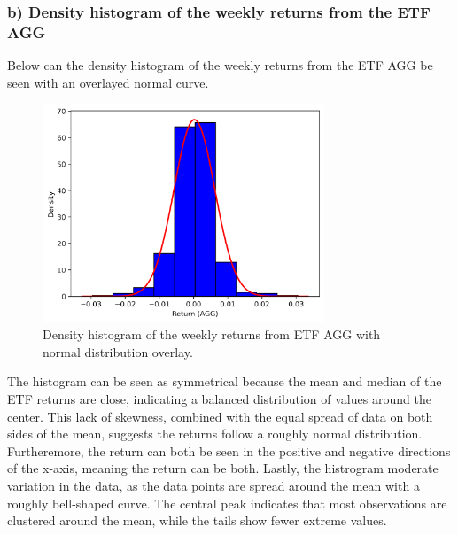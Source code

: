 \documentclass{rapport}
\begin{document}
\subsubsection*{\textbf{b)} Density histogram of the weekly returns from the ETF AGG}
\noindent
Below can the density histogram of the weekly returns from the ETF AGG be seen with an overlayed normal curve. 
\begin{figure}[H]
    \centering
    \includegraphics[width=0.75\textwidth]{histogram_with_normal_curve.png}  %
    \caption{\small Density histogram of the weekly returns from ETF AGG with normal distribution overlay.}  %
    \label{fig:histogram_AGG}
\end{figure}
\noindent
\noindent
The histogram can be seen as symmetrical because the mean and median of the ETF returns are close, indicating a balanced distribution of values around the center. 
This lack of skewness, combined with the equal spread of data on both sides of the mean, suggests the returns follow a roughly normal distribution.
Furtheremore, the return can both be seen in the positive and negative directions of the x-axis, 
meaning the return can be both. Lastly, the histrogram moderate variation in the data, as the data points are spread around the mean with a roughly bell-shaped curve. 
The central peak indicates that most observations are clustered around the mean, while the tails show fewer extreme values.  


\end{document}
